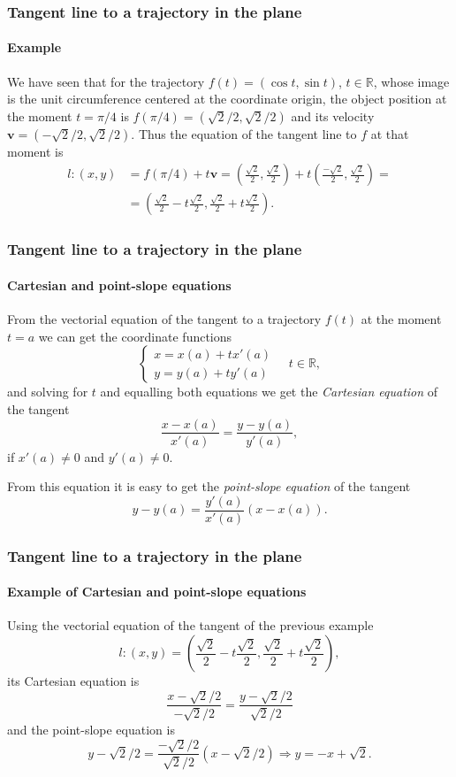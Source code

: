 \begin{frame}
\frametitle{Tangent line to a trajectory in the plane}
\framesubtitle{Example}
We have seen that for the trajectory $f(t) = (\cos t,\sin t)$, $t\in \mathbb{R}$, whose image is the unit circumference centered at the coordinate origin, the object position at the moment $t=\pi/4$ is $f(\pi/4)=(\sqrt{2}/2,\sqrt{2}/2)$ and its velocity $\mathbf{v}=(-\sqrt{2}/2,\sqrt{2}/2)$.
Thus the equation of the tangent line to $f$ at that moment is
\begin{align*}
l: (x,y) & = f(\pi/4)+t\mathbf{v} =
\left(\frac{\sqrt{2}}{2},\frac{\sqrt{2}}{2}\right)+t\left(\frac{-\sqrt{2}}{2},\frac{\sqrt{2}}{2}\right) =\\
& =\left(\frac{\sqrt{2}}{2}-t\frac{\sqrt{2}}{2},\frac{\sqrt{2}}{2}+t\frac{\sqrt{2}}{2}\right).
\end{align*}

\end{frame}


\begin{frame}
\frametitle{Tangent line to a trajectory in the plane}
\framesubtitle{Cartesian and point-slope equations}
From the vectorial equation of the tangent to a trajectory $f(t)$ at the moment $t=a$ we can get the coordinate functions
\[
\begin{cases}
x=x(a)+tx'(a)\\
y=y(a)+ty'(a)
\end{cases}
\quad t\in \mathbb{R},
\]
and solving for $t$ and equalling both equations we get the \emph{Cartesian equation} of the tangent
\[
\frac{x-x(a)}{x'(a)}=\frac{y-y(a)}{y'(a)},
\]
if $x'(a)\neq 0$ and $y'(a)\neq 0$.

From this equation it is easy to get the \emph{point-slope equation} of the tangent
\[
y-y(a)=\frac{y'(a)}{x'(a)}(x-x(a)).
\]
\end{frame}


\begin{frame}
\frametitle{Tangent line to a trajectory in the plane}
\framesubtitle{Example of Cartesian and point-slope equations}
Using the vectorial equation of the tangent of the previous example
\[
l: (x,y)=\left(\frac{\sqrt{2}}{2}-t\frac{\sqrt{2}}{2},\frac{\sqrt{2}}{2}+t\frac{\sqrt{2}}{2}\right),
\]
its Cartesian equation is
\[
\frac{x-\sqrt{2}/2}{-\sqrt{2}/2} = \frac{y-\sqrt{2}/2}{\sqrt{2}/2}
\]
and the point-slope equation is
\[
y-\sqrt{2}/2 = \frac{-\sqrt{2}/2}{\sqrt{2}/2}(x-\sqrt{2}/2) \Rightarrow y=-x+\sqrt{2}.
\]
\end{frame}


